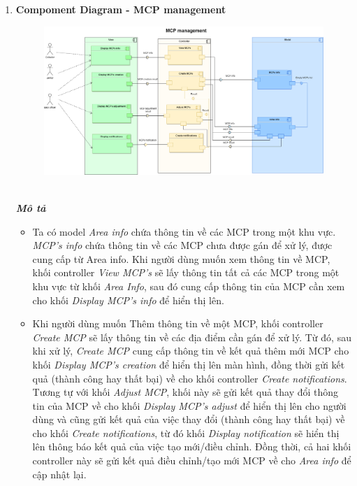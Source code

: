 \documentclass[a4paper]{article}
\begin{document}
\begin{enumerate}
\newpage
    \item \textbf{Compoment Diagram - MCP management}
        \begin{figure}[!h]
    \begin{center}
      \includegraphics[width=6in]{Image/MCP_mn_arch.png}
    \end{center}
\end{figure} 
\\
    \textbf{\textit{Mô tả}}
    \begin{itemize}
        \item Ta có model \textit{Area info} chứa thông tin về các MCP trong một khu vực. \textit{MCP's info} chứa thông tin về các MCP chưa được gán để xử lý, được cung cấp từ Area info. Khi người dùng muốn xem thông tin về MCP, khối controller \textit{View MCP's} sẽ lấy thông tin tất cả các MCP trong một khu vực từ khối \textit{Area Info}, sau đó cung cấp thông tin của MCP cần xem cho khối \textit{Display MCP's info} để hiển thị lên.
        \item Khi người dùng muốn Thêm thông tin về một MCP, khối controller \textit{Create MCP} sẽ lấy thông tin về các địa điểm cần gán để xử lý. Từ đó, sau khi xử lý, \textit{Create MCP} cung cấp thông tin về kết quả thêm mới MCP cho khối \textit{Display MCP's creation} để hiển thị lên màn hình, đồng thời gửi kết quả (thành công hay thất bại) về cho khối controller \textit{Create notifications}. Tương tự với khối \textit{Adjust MCP}, khối này sẽ gửi kết quả thay đổi thông tin của MCP về cho khối \textit{Display MCP's adjust} để hiển thị lên cho người dùng và cũng gửi kết quả của việc thay đổi (thành công hay thất bại) về cho khối\textit{ Create notifications}, từ đó khối \textit{Display notification} sẽ hiển thị lên thông báo kết quả của việc tạo mới/điều chỉnh. Đồng thời, cả hai khối controller này sẽ gửi kết quả điều chỉnh/tạo mới MCP về cho \textit{Area info} để cập nhật lại.

\end{itemize}
\end{enumerate}
\end{document}
